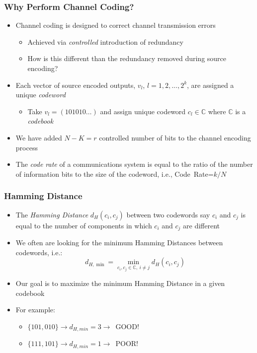 \documentclass[10pt]{beamer}
\begin{document}
\frame
{
  \frametitle{Why Perform Channel Coding?}
  \begin{itemize}
    \item Channel coding is designed to correct channel transmission errors
    \begin{itemize}
        \item Achieved via {\it controlled} introduction of redundancy
        \item How is this different than the redundancy removed during source encoding?
    \end{itemize}
    \item Each vector of source encoded outputs, $v_{l}$, $l=1,2,...,2^k$, are assigned a unique {\it codeword}
    \begin{itemize}
        \item Take $v_{l}=(101010\ldots)$ and assign unique codeword ${c_l}\in{\mathbb{C}}$ where $\mathbb{C}$ is a {\it codebook}
    \end{itemize}
    \item We have added $N-K=r$ controlled number of bits to the channel encoding process
    \item The {\it code rate} of a communications system is equal to the ratio of the number of information bits to the size of the codeword, i.e., Code~Rate=$k/N$
  \end{itemize}

}
\frame
{
  \frametitle{Hamming Distance}

    \begin{itemize}
       \item The {\it Hamming Distance} $d_H(c_i,c_j)$ between two codewords say ${c_{i}}$ and ${c_{j}}$ is equal to the number of components in which ${c_{i}}$ and ${c_{j}}$ are different
        \item We often are looking for the minimum Hamming Distances between codewords, i.e.:
        \begin{equation}
            d_{H,\min}=\min\limits_{c_i,c_j\in\mathbb{C},~i\neq{j}}{d_H(c_i,c_j)}
        \end{equation}
        \item Our goal is to maximize the minimum Hamming Distance in a given codebook
        \item For example:
        \begin{itemize}
            \item $\{101,010\}\rightarrow{d_{H,min}}=3\rightarrow$~GOOD!
            \item $\{111,101\}\rightarrow{d_{H,min}}=1\rightarrow$~POOR!
        \end{itemize}
    \end{itemize}

}
\end{document}

